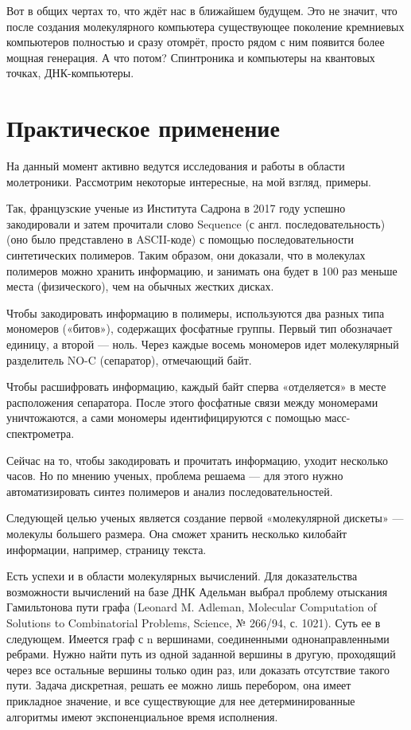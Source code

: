 \documentclass[titlepage, 12pt]{article}
\begin{document}
Вот в общих чертах то, что ждёт нас в ближайшем будущем. Это не значит, что после создания молекулярного компьютера существующее поколение кремниевых компьютеров полностью и сразу отомрёт, просто рядом с ним появится более мощная генерация. А что потом? Спинтроника и компьютеры на квантовых точках, ДНК-компьютеры.

\section{Практическое применение}
На данный момент активно ведутся исследования и работы в области молетроники. Рассмотрим некоторые интересные, на мой взгляд, примеры.

Так, французские ученые из Института Садрона в 2017 году успешно закодировали и затем прочитали слово Sequence (с англ. последовательность) (оно было представлено в ASCII-коде) с помощью последовательности синтетических полимеров. Таким образом, они доказали, что в молекулах полимеров можно хранить информацию, и занимать она будет в 100 раз меньше места (физического), чем на обычных жестких дисках. 


Чтобы закодировать информацию в полимеры, используются два разных типа мономеров («битов»), содержащих фосфатные группы. Первый тип обозначает единицу, а второй — ноль. Через каждые восемь мономеров идет молекулярный разделитель NO-C (сепаратор), отмечающий байт.

Чтобы расшифровать информацию, каждый байт сперва «отделяется» в месте расположения сепаратора. После этого фосфатные связи между мономерами уничтожаются, а сами мономеры идентифицируются с помощью масс-спектрометра.

Сейчас на то, чтобы закодировать и прочитать информацию, уходит несколько часов. Но по мнению ученых, проблема решаема — для этого нужно автоматизировать синтез полимеров и анализ последовательностей.

Следующей целью ученых является создание первой «молекулярной дискеты» — молекулы большего размера. Она сможет хранить несколько килобайт информации, например, страницу текста.

Есть успехи и в области молекулярных вычислений. Для доказательства возможности вычислений на базе ДНК Адельман выбрал проблему отыскания Гамильтонова пути графа (Leonard M. Adleman, Molecular Computation of Solutions to Combinatorial Problems, Science, № 266/94, с. 1021). Суть ее в следующем. Имеется граф с n вершинами, соединенными однонаправленными ребрами. Нужно найти путь из одной заданной вершины в другую, проходящий через все остальные вершины только один раз, или доказать отсутствие такого пути. Задача дискретная, решать ее можно лишь перебором, она имеет прикладное значение, и все существующие для нее детерминированные алгоритмы имеют экспоненциальное время исполнения.
\end{document}
